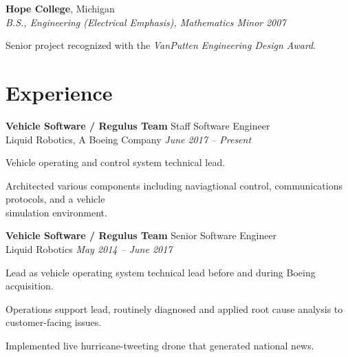 \documentclass[article]{resume}
\begin{document}
{\textbf{Hope College}, Michigan\\
\textsl{B.S., Engineering (Electrical Emphasis), Mathematics Minor} \hfill \textsl{2007}\\\vspace{ -2 mm}
    \begin{list2}
        \item Senior project recognized with the \textit{VanPutten Engineering Design Award}.
    \end{list2}
    \vspace{ -2 mm}
    \section{Experience}
\vspace*{0.5\baselineskip}
    \textbf{Vehicle Software / Regulus Team} \hfill Staff Software Engineer\\  
    Liquid Robotics, A Boeing Company \hfill \textsl{June 2017 -- Present} \\
    \vspace{ -2 mm}
    \begin{list2}
        \item Vehicle operating and control system technical lead.
        \item Architected various components including naviagtional control, communications protocols, and a vehicle \\ simulation environment.
    \end{list2}\vspace{-2mm}

    \textbf{Vehicle Software / Regulus Team} \hfill Senior Software Engineer\\  
    Liquid Robotics \hfill \textsl{May 2014 -- June 2017} \\
    \vspace{ -2 mm}
    \begin{list2}
        \item Lead as vehicle operating system technical lead before and during Boeing acquisition.
        \item Operations support lead, routinely diagnosed and applied root cause analysis to customer-facing issues.
        \item Implemented live hurricane-tweeting drone that generated national news.
    \end{list2}\vspace{-2mm}

}
\end{document}
